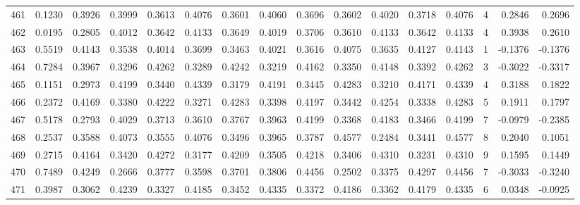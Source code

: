 \begin{tabular}{lrrrrrrrrrrrrrrr}
461 &      0.1230 &  0.3926 &  0.3999 &  0.3613 &  0.4076 &  0.3601 &  0.4060 &  0.3696 &  0.3602 &  0.4020 &   0.3718 &     0.4076 &      4 &                    0.2846 &                     0.2696 \\
462 &      0.0195 &  0.2805 &  0.4012 &  0.3642 &  0.4133 &  0.3649 &  0.4019 &  0.3706 &  0.3610 &  0.4133 &   0.3642 &     0.4133 &      4 &                    0.3938 &                     0.2610 \\
463 &      0.5519 &  0.4143 &  0.3538 &  0.4014 &  0.3699 &  0.3463 &  0.4021 &  0.3616 &  0.4075 &  0.3635 &   0.4127 &     0.4143 &      1 &                   -0.1376 &                    -0.1376 \\
464 &      0.7284 &  0.3967 &  0.3296 &  0.4262 &  0.3289 &  0.4242 &  0.3219 &  0.4162 &  0.3350 &  0.4148 &   0.3392 &     0.4262 &      3 &                   -0.3022 &                    -0.3317 \\
465 &      0.1151 &  0.2973 &  0.4199 &  0.3440 &  0.4339 &  0.3179 &  0.4191 &  0.3445 &  0.4283 &  0.3210 &   0.4171 &     0.4339 &      4 &                    0.3188 &                     0.1822 \\
466 &      0.2372 &  0.4169 &  0.3380 &  0.4222 &  0.3271 &  0.4283 &  0.3398 &  0.4197 &  0.3442 &  0.4254 &   0.3338 &     0.4283 &      5 &                    0.1911 &                     0.1797 \\
467 &      0.5178 &  0.2793 &  0.4029 &  0.3713 &  0.3610 &  0.3767 &  0.3963 &  0.4199 &  0.3368 &  0.4183 &   0.3466 &     0.4199 &      7 &                   -0.0979 &                    -0.2385 \\
468 &      0.2537 &  0.3588 &  0.4073 &  0.3555 &  0.4076 &  0.3496 &  0.3965 &  0.3787 &  0.4577 &  0.2484 &   0.3441 &     0.4577 &      8 &                    0.2040 &                     0.1051 \\
469 &      0.2715 &  0.4164 &  0.3420 &  0.4272 &  0.3177 &  0.4209 &  0.3505 &  0.4218 &  0.3406 &  0.4310 &   0.3231 &     0.4310 &      9 &                    0.1595 &                     0.1449 \\
470 &      0.7489 &  0.4249 &  0.2666 &  0.3777 &  0.3598 &  0.3701 &  0.3806 &  0.4456 &  0.2502 &  0.3375 &   0.4297 &     0.4456 &      7 &                   -0.3033 &                    -0.3240 \\
471 &      0.3987 &  0.3062 &  0.4239 &  0.3327 &  0.4185 &  0.3452 &  0.4335 &  0.3372 &  0.4186 &  0.3362 &   0.4179 &     0.4335 &      6 &                    0.0348 &                    -0.0925 \\

\end{tabular}
